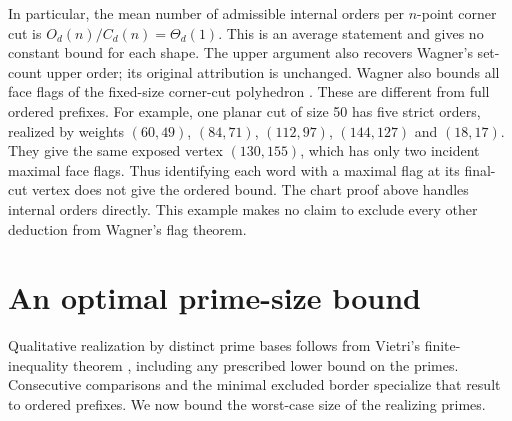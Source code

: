 \documentclass[11pt,a4paper]{article}
\theoremstyle{remark}
\begin{document}
In particular, the mean number of admissible internal orders per
\(n\)-point corner cut is \(O_d(n)/C_d(n)=\Theta_d(1)\).
This is an average statement and gives no constant bound for each shape.
The upper argument also recovers Wagner's set-count upper order;
its original attribution is unchanged.
Wagner also bounds all face flags of the fixed-size corner-cut
polyhedron \cite[Section 3.5]{W03}. These are different from full
ordered prefixes. For example, one planar cut of size 50 has five strict
orders, realized by weights \((60,49)\), \((84,71)\), \((112,97)\),
\((144,127)\) and \((18,17)\). They give the same exposed vertex
\((130,155)\), which has only two incident maximal face flags.
Thus identifying each word with a maximal flag at its final-cut vertex
does not give the ordered bound. The chart proof above handles internal
orders directly. This example makes no claim to exclude every other
deduction from Wagner's flag theorem.

\section{An optimal prime-size bound}\label{sec:primeheight}
Qualitative realization by distinct prime bases follows from Vietri's
finite-inequality theorem \cite[Proposition 6.2]{Vietri}, including any
prescribed lower bound on the primes. Consecutive comparisons and the
minimal excluded border specialize that result to ordered prefixes.
We now bound the worst-case size of the realizing primes.
\end{document}
